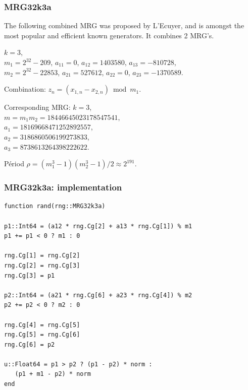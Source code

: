 \documentclass{beamer}
\begin{document}
	\begin{frame}
		\frametitle{MRG32k3a}
		
		The following combined MRG was proposed by L'Ecuyer, and is amongst
		the most popular and efficient known generators.
		It combines 2 MRG's.
		
		\mbox{}
		
		$k=3$, \\
		$m_1 = 2^{32} -209$, $a_{11} = 0$, $a_{12} = 1403580$, $a_{13} = -810728$,\\
		$m_2 = 2^{32}-22853$, $a_{21} = 527612$, $a_{22} = 0$, $a_{23} = -1370589$.\\
		
		\mbox{}
		
		Combination: $z_n = (x_{1,n} - x_{2,n}) \bmod m_1$.
		
		\mbox{}
		
		Corresponding MRG: $k=3$,\\
		$m = m_1 m_2 = 18446645023178547541$, \\
		$a_{1} = 18169668471252892557$,\\
		$a_{2} = 3186860506199273833$,\\ 
		$a_{3} = 8738613264398222622$.
		
		\mbox{}
		
		P\'eriod $\rho = (m_1^3-1)(m_2^3-1)/2 \approx 2^{191}$.
	\end{frame}
	
	\begin{frame}[containsverbatim]
		\frametitle{MRG32k3a: implementation}
		
		\begin{footnotesize}
			\begin{verbatim}
function rand(rng::MRG32k3a)

p1::Int64 = (a12 * rng.Cg[2] + a13 * rng.Cg[1]) % m1
p1 += p1 < 0 ? m1 : 0

rng.Cg[1] = rng.Cg[2]
rng.Cg[2] = rng.Cg[3]
rng.Cg[3] = p1

p2::Int64 = (a21 * rng.Cg[6] + a23 * rng.Cg[4]) % m2
p2 += p2 < 0 ? m2 : 0

rng.Cg[4] = rng.Cg[5]
rng.Cg[5] = rng.Cg[6]
rng.Cg[6] = p2

u::Float64 = p1 > p2 ? (p1 - p2) * norm :
   (p1 + m1 - p2) * norm
end
			\end{verbatim}
			\end{footnotesize}
			
		\end{frame}
		
\end{document}

